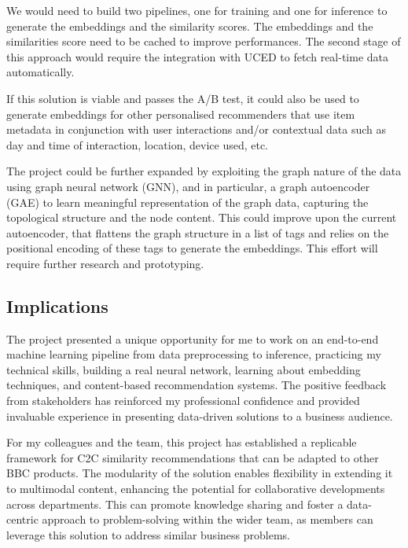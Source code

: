 We would need to build two pipelines, one for training and one for inference to generate the embeddings and the similarity scores.
The embeddings and the similarities score need to be cached to improve performances.
The second stage of this approach would require the integration with UCED to fetch real-time data automatically.

If this solution is viable and passes the A/B test, it could also be used to generate embeddings for
other personalised recommenders that use item metadata in conjunction with user interactions and/or contextual data such as
day and time of interaction, location, device used, etc.

The project could be further expanded by exploiting the graph nature of the data using graph neural network (GNN),
and in particular, a graph autoencoder (GAE) to learn meaningful representation of the graph data,
capturing the topological structure and the node content.
This could improve upon the current autoencoder, that flattens the graph structure in a list of tags and
relies on the positional encoding of these tags to generate the embeddings.
This effort will require further research and prototyping.

\subsection{Implications}

The project presented a unique opportunity for me to work on an end-to-end machine learning pipeline from data preprocessing
to inference, practicing my technical skills,
building a real neural network, learning about embedding techniques, and content-based
recommendation systems. The positive feedback from stakeholders has reinforced my professional confidence and
provided invaluable experience in presenting data-driven solutions to a business audience.

For my colleagues and the team, this project has established a replicable framework for C2C similarity recommendations
that can be adapted to other BBC products. The modularity of the solution enables flexibility in extending it to
multimodal content, enhancing the potential for collaborative developments across departments.
This can promote knowledge sharing and foster a data-centric approach to problem-solving within the wider team,
as members can leverage this solution to address similar business problems.

